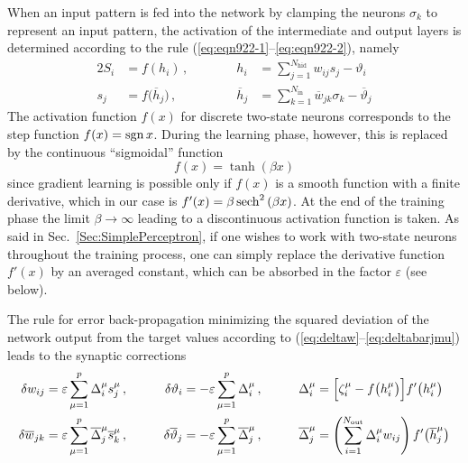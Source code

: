 When an input pattern is fed into the network by clamping the neurons $\sigma_k$ to represent an input pattern, the activation of the intermediate and output layers is determined according to the rule (\ref{eq:eqn922-1}--\ref{eq:eqn922-2}), namely
\begin{alignat}{2}
S_i&=f(h_i)\,, &\qquad\quad h_i&=\sum_{j=1}^{N_{\text{hid}}}w_{ij}s_j-\vartheta_i\\
s_j&=f\bigl(\overline{h}_j\bigr)\,, &\qquad\quad \overline{h}_j&=\sum_{k=1}^{N_{\text{in}}}\overline{w}_{jk}\sigma_k-\overline{\vartheta}_j
\end{alignat}
The activation function $f(x)$ for discrete two-state neurons corresponds to the step function $f(x)=\operatorname{sgn}{x}$. During the learning phase, however, this is replaced by the continuous ``sigmoidal'' function
\begin{equation}
f(x)=\tanh{(\beta x)}
\end{equation}
since gradient learning is possible only if $f(x)$ is a smooth function with a finite derivative, which in our case is $f'(x)=\beta\operatorname{sech}^2{(\beta x)}$. At the end of the training phase the limit $\beta\rightarrow\infty$ leading to a discontinuous activation function is taken. As said in Sec.~\ref{Sec:SimplePerceptron}, if one wishes to work with two-state neurons throughout the training process, one can simply replace the derivative function $f'(x)$ by an averaged constant, which can be absorbed in the factor $\varepsilon$ (see below).

The rule for error back-propagation minimizing the squared deviation of the network output from the target values according to (\ref{eq:deltaw}--\ref{eq:deltabarjmu}) leads to the synaptic corrections
\begin{alignat}{3}
\delta w_{ij}&=\varepsilon\sum_{\mu=1}^p\Delta_i^\mu s_j^\mu\,, &\qquad \delta\vartheta_i&=-\varepsilon\sum_{\mu=1}^p\Delta_i^\mu\,, &\qquad \Delta_i^\mu&=\Bigl[\zeta_i^\mu-f\bigl(h_i^\mu\bigr)\Bigr]f'\bigl(h_i^\mu\bigr)\label{PERBOOL:4.04}\\
\delta\overline{w}_{jk}&=\varepsilon\sum_{\mu=1}^p\overline{\Delta}_j^\mu\overline{s}_k^\mu\,, &\qquad \delta\overline{\vartheta}_j&=-\varepsilon\sum_{\mu=1}^p\overline{\Delta}_j^\mu\,, &\qquad \overline{\Delta}_j^\mu&=\left(\sum_{i=1}^{N_{\text{out}}}\Delta_i^\mu w_{ij}\right)f'\bigl(\overline{h}_j^\mu\bigr)
\end{alignat}

